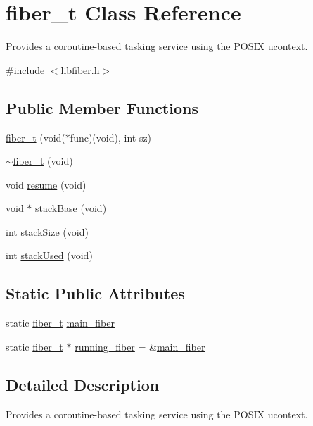 \hypertarget{classfiber__t}{}\section{fiber\+\_\+t Class Reference}
\label{classfiber__t}


Provides a coroutine-\/based tasking service using the P\+O\+S\+IX ucontext.  




{\ttfamily \#include $<$libfiber.\+h$>$}

\subsection*{Public Member Functions}
\begin{DoxyCompactItemize}
\item 
\hyperlink{classfiber__t_a50a8f05937a58d95a71d3ede82b1efd0}{fiber\+\_\+t} (void($\ast$func)(void), int sz)
\item 
\hyperlink{classfiber__t_a9c9fe3849bd98abdbb4c9bffd999517f}{$\sim$fiber\+\_\+t} (void)
\item 
void \hyperlink{classfiber__t_aceda850cc53b943217da36b704f6f133}{resume} (void)
\item 
void $\ast$ \hyperlink{classfiber__t_a64b080d0c21caf0223c4866350b454c9}{stack\+Base} (void)
\item 
int \hyperlink{classfiber__t_abce88a91afa77d0ae5781dd9683c4b48}{stack\+Size} (void)
\item 
int \hyperlink{classfiber__t_a5debce5b9bd44ae04cb039456de8a4e9}{stack\+Used} (void)
\end{DoxyCompactItemize}
\subsection*{Static Public Attributes}
\begin{DoxyCompactItemize}
\item 
static \hyperlink{classfiber__t}{fiber\+\_\+t} \hyperlink{classfiber__t_ae6a75ba1b2421668d4611272a7c841fa}{main\+\_\+fiber}
\item 
static \hyperlink{classfiber__t}{fiber\+\_\+t} $\ast$ \hyperlink{classfiber__t_aa54a9653ee240c81c8b2ba161e1b5bd3}{running\+\_\+fiber} = \&\hyperlink{classfiber__t_ae6a75ba1b2421668d4611272a7c841fa}{main\+\_\+fiber}
\end{DoxyCompactItemize}


\subsection{Detailed Description}
Provides a coroutine-\/based tasking service using the P\+O\+S\+IX ucontext. 

